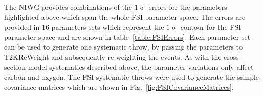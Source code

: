 The NIWG provides combinations of the $1\upsigma$ errors for the parameters highlighted above which span the whole FSI parameter space.  The errors are provided in 16 parameters sets which represent the $1\upsigma$ contour for the FSI parameter space and are shown in table~\ref{table:FSIErrors}.  Each parameter set can be used to generate one systematic throw, by passing the parameters to T2KReWeight and subsequently re-weighting the events.  As with the cross-section model systematics described above, the parameter variations only affect carbon and oxygen.  The FSI systematic throws were used to generate the sample covariance matrices which are shown in Fig.~\ref{fig:FSICovarianceMatrices}.
